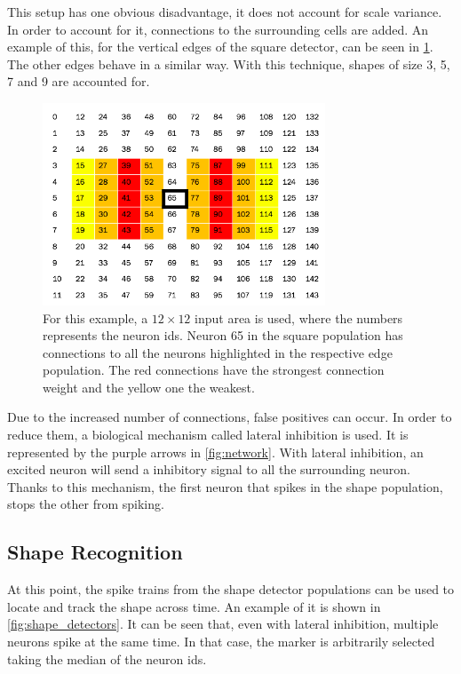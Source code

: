 This setup has one obvious disadvantage, it does not account for scale variance. In order to account for it, connections to the surrounding cells are added. An example of this, for the vertical edges of the square detector, can be seen in \cref{fig:shapes_connections}. The other edges behave in a similar way. With this technique, shapes of size 3, 5, 7 and 9 are accounted for. 

\begin{figure}[ht]
\centering
\includegraphics[width=0.75\textwidth]{images/development/shapes_connections.png}
\caption[Vertical Edges of the Square Detector]{For this example, a $12 \times 12$ input area is used, where the numbers represents the neuron ids. Neuron 65 in the square population has connections to all the neurons highlighted in the respective edge population. The red connections have the strongest connection weight and the yellow one the weakest.}
\label{fig:shapes_connections}
\end{figure}

Due to the increased number of connections, false positives can occur. In order to reduce them, a biological mechanism called lateral inhibition is used. It is represented by the purple arrows in \cref{fig:network}. With lateral inhibition, an excited neuron will send a inhibitory signal to all the surrounding neuron. Thanks to this mechanism, the first neuron that spikes in the shape population, stops the other from spiking.

\subsection{Shape Recognition}
At this point, the spike trains from the shape detector populations can be used to locate and track the shape across time. An example of it is shown in \cref{fig:shape_detectors}. It can be seen that, even with lateral inhibition, multiple neurons spike at the same time. In that case, the marker is arbitrarily selected taking the median of the neuron ids. 

